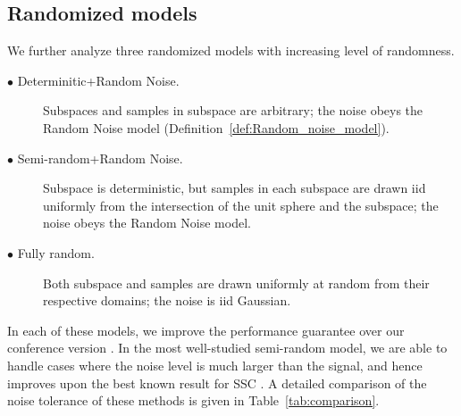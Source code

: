 \documentclass[twoside,11pt]{article}
\numberwithin{equation}{section}
\begin{document}

\subsection{Randomized models}
We  further analyze three randomized models with increasing level of randomness.
\begin{description}
  \item[$\bullet$ Determinitic+Random Noise.] Subspaces and samples in subspace are arbitrary; the noise obeys the Random Noise model (Definition~\ref{def:Random_noise_model}).
  \item[$\bullet$ Semi-random+Random Noise.] Subspace is deterministic, but samples in each subspace are drawn iid uniformly from the intersection of the unit sphere and the subspace; the noise obeys the Random Noise model.
  \item[$\bullet$ Fully random.] Both subspace and samples are drawn uniformly at random from their respective domains; the noise is iid Gaussian.%
\end{description}
In each of these models, we improve the performance guarantee over our conference version \citep{wang2013noisy}. In the most well-studied semi-random model, we are able to handle cases where the noise level is much larger than the signal, and hence improves upon the best known result for SSC \citet{soltanolkotabi2013robust}. A detailed comparison of the noise tolerance of these methods is given in Table~\ref{tab:comparison}.
\end{document}
